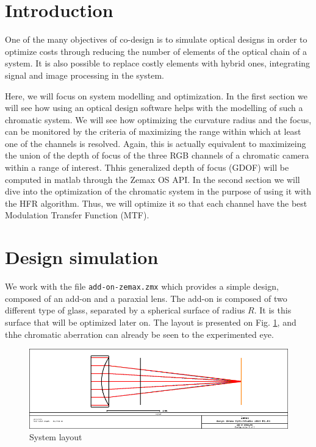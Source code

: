 \documentclass[10pt,letterpaper]{article}
\begin{document}
\section{Introduction}
One of the many objectives of co-design is to simulate optical designs in order to optimize costs through reducing the number of elements of the optical chain of a system. It is also possible to replace costly elements with hybrid ones, integrating signal and image processing in the system.

Here, we will focus on system modelling and optimization. In the first section we will see how using an optical design software helps with the modelling of such a chromatic system. We will see how optimizing the curvature radius and the focus, can be monitored by the criteria of maximizing the range within which at least one of the channels is resolved. Again, this is actually equivalent to maximizeing the union of the depth of focus of the three RGB channels of a chromatic camera within a range of interest. Thhis generalized depth of focus (GDOF) will be computed in matlab through the Zemax OS API.  In the second section we will dive into the optimization of the chromatic system in the purpose of using it with the HFR algorithm. Thus, we will optimize it so that each channel have the best Modulation Transfer Function (MTF).

\section{Design simulation}

We work with the file \texttt{add-on-zemax.zmx} which provides a simple design, composed of an add-on and a paraxial lens. The add-on is composed of two different type of glass, separated by a spherical surface of radius $R$. It is this surface that will be optimized later on. The layout is presented on Fig. \ref{fig:layout}, and thhe chromatic aberration can already be seen to the experimented eye.

\begin{figure}[h]
	\centering
	\includegraphics[scale=0.45]{Layout.png}
	\caption{System layout}
	\label{fig:layout}
\end{figure}
\end{document}
